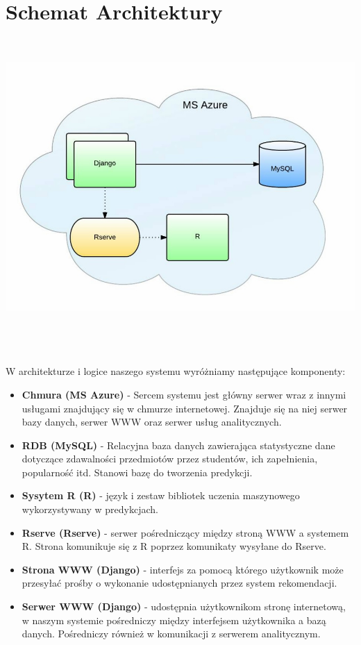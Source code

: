 \documentclass[licencjacka]{pracamgr}
\begin{document}
\section{Schemat Architektury}
~\\
\begin{minipage}{\linewidth} 
	\centering
           \includegraphics[scale = 0.5]{architekturaFin.jpg}
\end{minipage} \\ \\ \\
 W architekturze i logice naszego systemu wyróżniamy następujące komponenty:
 \begin{itemize}
 
\item \textbf{Chmura (MS Azure)} - Sercem systemu jest główny serwer wraz z innymi usługami znajdujący się w chmurze internetowej. Znajduje się na niej serwer bazy danych, serwer WWW oraz serwer usług analitycznych.

\item \textbf {RDB (MySQL)} - Relacyjna baza danych zawierająca statystyczne dane dotyczące zdawalności przedmiotów przez studentów, ich zapełnienia, popularność itd. Stanowi bazę do tworzenia predykcji.

\item \textbf{Sysytem R (R)} - język i zestaw bibliotek uczenia maszynowego wykorzystywany w predykcjach.

\item \textbf{Rserve (Rserve)} - serwer pośredniczący między stroną WWW a systemem R. Strona komunikuje się z R
poprzez komunikaty wysyłane do Rserve.
 

\item \textbf{Strona WWW (Django)} - interfejs za pomocą którego użytkownik może przesyłać prośby o wykonanie udostępnianych przez system rekomendacji.

\item \textbf{Serwer WWW (Django)} - udostępnia użytkownikom stronę internetową, w naszym systemie pośredniczy między interfejsem użytkownika a bazą danych. Pośredniczy również w komunikacji z serwerem analitycznym.

  
\end{itemize}
\end{document}
